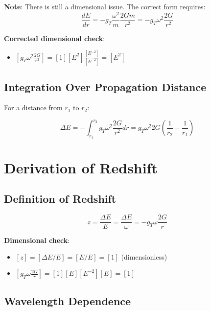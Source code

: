 \documentclass[12pt,a4paper]{article}
\begin{document}
	\textbf{Note}: There is still a dimensional issue. The correct form requires:
	\begin{equation}
		\boxed{\frac{dE}{dr} = -g_T \frac{\omega^2}{m} \frac{2Gm}{r^2} = -g_T \omega^2 \frac{2G}{r^2}}
	\end{equation}
	
	\textbf{Corrected dimensional check}:
	\begin{itemize}
		\item $[g_T \omega^2 \frac{2G}{r^2}] = [1][E^2]\frac{[E^{-2}]}{[E^{-2}]} = [E^2]$ \checkmark
	\end{itemize}
	
	\subsection{Integration Over Propagation Distance}
	\label{subsec:integration}
	
	For a distance from $r_1$ to $r_2$:
	
	\begin{equation}
		\label{eq:integration_distance}
		\Delta E = -\int_{r_1}^{r_2} g_T \omega^2 \frac{2G}{r^2} dr = g_T \omega^2 2G \left(\frac{1}{r_2} - \frac{1}{r_1}\right)
	\end{equation}
	
	\section{Derivation of Redshift}
	\label{sec:redshift_derivation}
	
	\subsection{Definition of Redshift}
	\label{subsec:redshift_definition}
	
	\begin{equation}
		\label{eq:redshift_definition}
		z = \frac{\Delta E}{E} = \frac{\Delta E}{\omega} = -g_T \omega \frac{2G}{r}
	\end{equation}
	
	\textbf{Dimensional check}:
	\begin{itemize}
		\item $[z] = [\Delta E/E] = [E/E] = [1]$ (dimensionless) \checkmark
		\item $[g_T \omega \frac{2G}{r}] = [1][E][E^{-2}][E] = [1]$ \checkmark
	\end{itemize}
	
	\subsection{Wavelength Dependence}
	\label{subsec:wavelength_dependence}
	
\end{document}
